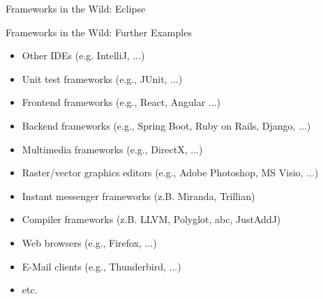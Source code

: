 \begin{frame}{Frameworks in the Wild: Eclipse \mytitlesource{\featureide}}
	\begin{mycolumns}[forget]
	\mynextcolumn
	\end{mycolumns}
\end{frame}

\begin{frame}{Frameworks in the Wild: Further Examples}
	\begin{mycolumns}[widths={75,25},animation=none]
		\begin{example}{}
			\begin{itemize}
				\item Other IDEs (e.g. IntelliJ, ...)
				\item Unit test frameworks (e.g., JUnit, ...)
				\item Frontend frameworks (e.g., React, Angular ...)
				\item Backend frameworks (e.g., Spring Boot, Ruby on Rails, Django, ...) 
				\item Multimedia frameworks (e.g., DirectX, ...)
				\item Raster/vector graphics editors (e.g., Adobe Photoshop, MS Visio, ...)
				\item Instant messenger frameworks (z.B. Miranda, Trillian)
				\item Compiler frameworks (z.B. LLVM, Polyglot, abc, JustAddJ)
				\item Web browsers (e.g., Firefox, ...)
				\item E-Mail clients (e.g., Thunderbird, ...)
				\item etc.
			\end{itemize}
		\end{example}		
	\mynextcolumn
		~
	\end{mycolumns}
\end{frame}


